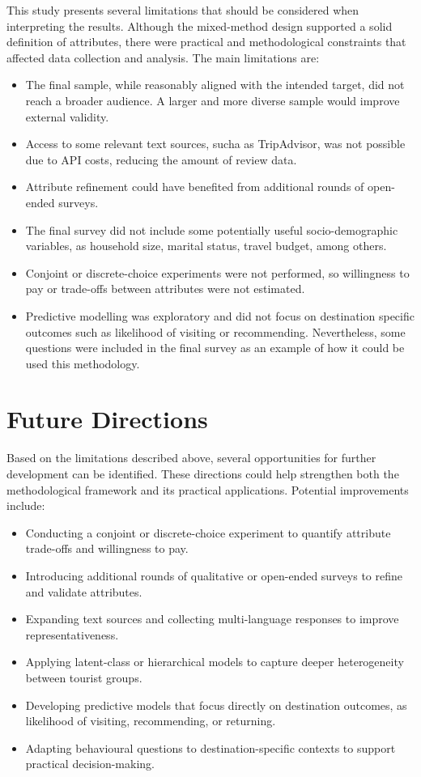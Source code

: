 \documentclass[a4paper, 12pt, twoside]{report}  %
\begin{document}
\indent This study presents several limitations that should be considered when interpreting the results. Although the mixed-method design supported a solid definition of attributes, there were practical and methodological constraints that affected data collection and analysis. The main limitations are:

\begin{itemize}
    \item The final sample, while reasonably aligned with the intended target, did not reach a broader audience. A larger and more diverse sample would improve external validity.
    \item Access to some relevant text sources, sucha as TripAdvisor, was not possible due to API costs, reducing the amount of review data.
    \item Attribute refinement could have benefited from additional rounds of open-ended surveys.
    \item The final survey did not include some potentially useful socio-demographic variables, as household size, marital status, travel budget, among others.
    \item Conjoint or discrete-choice experiments were not performed, so willingness to pay or trade-offs between attributes were not estimated.
    \item Predictive modelling was exploratory and did not focus on destination specific outcomes such as likelihood of visiting or recommending. Nevertheless, some questions were included in the final survey as an example of how it could be used this methodology.
\end{itemize}

\section{Future Directions}

\indent Based on the limitations described above, several opportunities for further development can be identified. These directions could help strengthen both the methodological framework and its practical applications. Potential improvements include:

\begin{itemize}
    \item Conducting a conjoint or discrete-choice experiment to quantify attribute trade-offs and willingness to pay.
    \item Introducing additional rounds of qualitative or open-ended surveys to refine and validate attributes.
    \item Expanding text sources and collecting multi-language responses to improve representativeness.
    \item Applying latent-class or hierarchical models to capture deeper heterogeneity between tourist groups.
    \item Developing predictive models that focus directly on destination outcomes, as likelihood of visiting, recommending, or returning.
    \item Adapting behavioural questions to destination-specific contexts to support practical decision-making.
\end{itemize}
\end{document}
